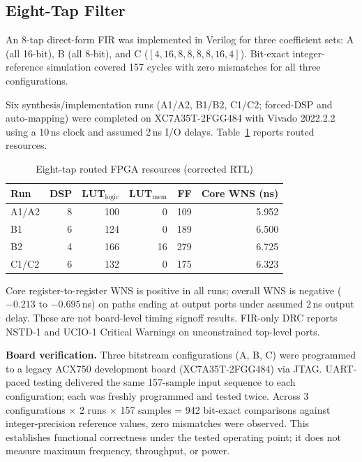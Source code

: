 
\subsection{Eight-Tap Filter}

An 8-tap direct-form FIR was implemented in Verilog for three coefficient
sets: A (all 16-bit), B (all 8-bit), and C ($[4,16,8,8,8,8,16,4]$).
Bit-exact integer-reference simulation covered 157 cycles with zero
mismatches for all three configurations.

Six synthesis/implementation runs (A1/A2, B1/B2, C1/C2; forced-DSP and
auto-mapping) were completed on XC7A35T-2FGG484 with Vivado 2022.2.2
using a 10\,ns clock and assumed 2\,ns I/O delays. Table~\ref{tab:fpga8}
reports routed resources.

\begin{table}[!t]
\caption{Eight-tap routed FPGA resources (corrected RTL)}
\label{tab:fpga8}
\centering
\scriptsize
\begin{tabular}{l r r r r r}
\toprule
Run & DSP & LUT$_\text{logic}$ & LUT$_\text{mem}$ & FF & Core WNS (ns)\\
\midrule
A1/A2 & 8 & 100 & 0 & 109 & 5.952\\
B1 & 6 & 124 & 0 & 189 & 6.500\\
B2 & 4 & 166 & 16 & 279 & 6.725\\
C1/C2 & 6 & 132 & 0 & 175 & 6.323\\
\bottomrule
\end{tabular}
\end{table}

Core register-to-register WNS is positive in all runs; overall WNS is
negative ($-0.213$ to $-0.695$\,ns) on paths ending at output ports under
assumed 2\,ns output delay. These are not board-level timing signoff
results. FIR-only DRC reports NSTD-1 and UCIO-1 Critical Warnings on
unconstrained top-level ports.

\textbf{Board verification.} Three bitstream configurations (A, B, C)
were programmed to a legacy ACX750 development board (XC7A35T-2FGG484)
via JTAG. UART-paced testing delivered the same 157-sample input sequence
to each configuration; each was freshly programmed and tested twice.
Across 3 configurations $\times$ 2 runs $\times$ 157 samples = 942
bit-exact comparisons against integer-precision reference values, zero
mismatches were observed. This establishes functional correctness under
the tested operating point; it does not measure maximum frequency,
throughput, or power.

